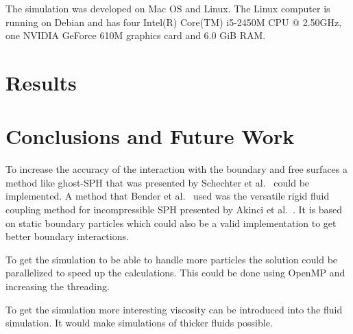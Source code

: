     The simulation was developed on Mac OS and Linux.
    The Linux computer is running on Debian and has four Intel(R) Core(TM) i5-2450M CPU @ 2.50GHz, one NVIDIA GeForce 610M graphics card and 6.0 GiB RAM. 


\section{Results}



\section{Conclusions and Future Work}

    To increase the accuracy of the interaction with the boundary and free surfaces a method like ghost-SPH that was presented by Schechter et al.~\cite{ghost} could be implemented.
    A method that Bender et al.~\cite{bender} used was the versatile rigid fluid coupling method for incompressible SPH presented by Akinci et al.~\cite{akinci2012versatile}.
    It is based on static boundary particles which could also be a valid implementation to get better boundary interactions.

    To get the simulation to be able to handle more particles the solution could be parallelized to speed up the calculations.
    This could be done using OpenMP and increasing the threading.

    To get the simulation more interesting viscosity can be introduced into the fluid simulation.
    It would make simulations of thicker fluids possible.






